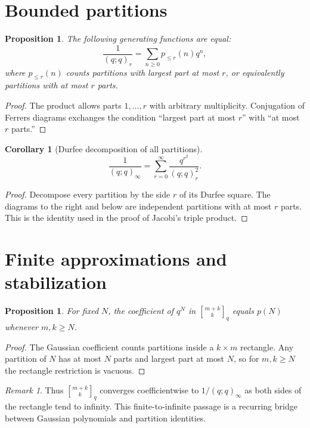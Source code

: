 \documentclass[11pt,oneside,openany]{book}
\newtheorem{proposition}[theorem]{Proposition}
\newtheorem{corollary}[theorem]{Corollary}
\theoremstyle{definition}
\theoremstyle{remark}
\newtheorem{remark}[theorem]{Remark}
\newcommand{\qbinom}[2]{\genfrac{[}{]}{0pt}{}{#1}{#2}_{q}}
\begin{document}
\section{Bounded partitions}

\begin{proposition}\label{prop:bounded-partitions}
The following generating functions are equal:
\[
 \frac1{(q;q)_r}
 =\sum_{n\ge0}p_{\le r}(n)q^n,
\]
where $p_{\le r}(n)$ counts partitions with largest part at most $r$, or equivalently partitions with at most $r$ parts.
\end{proposition}

\begin{proof}
The product allows parts $1,\dots,r$ with arbitrary multiplicity.  Conjugation of Ferrers diagrams exchanges the condition ``largest part at most $r$'' with ``at most $r$ parts.''
\end{proof}

\begin{corollary}[Durfee decomposition of all partitions]\label{cor:durfee-all}
\[
 \frac1{(q;q)_\infty}
 =\sum_{r=0}^{\infty}\frac{q^{r^2}}{(q;q)_r^2}.
\]
\end{corollary}

\begin{proof}
Decompose every partition by the side $r$ of its Durfee square.  The diagrams to the right and below are independent partitions with at most $r$ parts.  This is the identity used in the proof of Jacobi's triple product.
\end{proof}

\section{Finite approximations and stabilization}

\begin{proposition}\label{prop:partition-stabilization}
For fixed $N$, the coefficient of $q^N$ in $\qbinom{m+k}{k}$ equals $p(N)$ whenever $m,k\ge N$.
\end{proposition}

\begin{proof}
The Gaussian coefficient counts partitions inside a $k\times m$ rectangle.  Any partition of $N$ has at most $N$ parts and largest part at most $N$, so for $m,k\ge N$ the rectangle restriction is vacuous.
\end{proof}

\begin{remark}
Thus $\qbinom{m+k}{k}$ converges coefficientwise to $1/(q;q)_\infty$ as both sides of the rectangle tend to infinity.  This finite-to-infinite passage is a recurring bridge between Gaussian polynomials and partition identities.
\end{remark}
\end{document}
